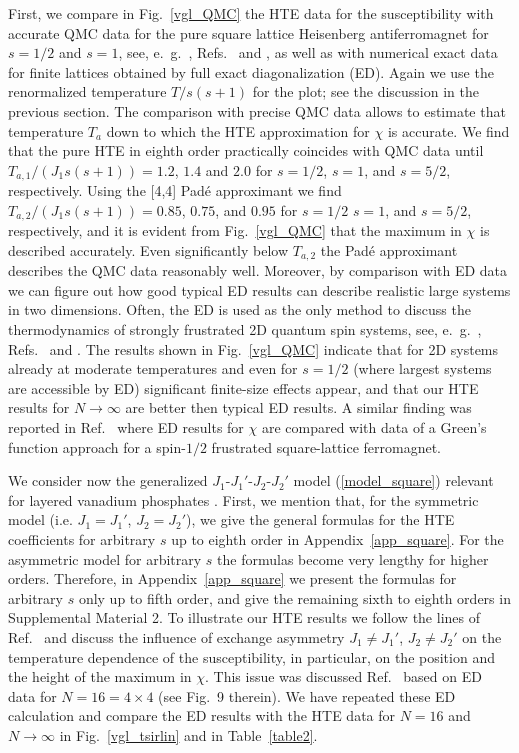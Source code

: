 \documentclass[aps,twocolumn,groupedaddress]{revtex4}
\begin{document}
First, we compare in Fig.~\ref{vgl_QMC} the HTE data for the susceptibility  with accurate QMC data
for the pure square
lattice Heisenberg antiferromagnet  for $s=1/2$ and $s=1$, see, e.~g.~,
Refs.~ and , as well as with numerical exact
data for finite lattices obtained by full exact diagonalization (ED). Again
we use the renormalized temperature $T/s(s+1)$ for the plot; see the
discussion in the previous section.
The comparison with  precise QMC data allows to estimate that
temperature $T_a$ down to which the HTE approximation for $\chi$ is accurate.
We find that the pure HTE in eighth order practically coincides with QMC data
until $T_{a,1}/(J_1s(s+1))=1.2$, $1.4$ and $2.0$ for $s=1/2$, $s=1$,  and $s=5/2$,
respectively. Using the [4,4]
Pad\'e approximant we find $T_{a,2}/(J_1s(s+1))=0.85$, $0.75$, and $0.95$ for $s=1/2$
$s=1$,  and $s=5/2$,
respectively, and it is evident from Fig.~\ref{vgl_QMC} that the
maximum in $\chi$ is described accurately.
Even significantly below $T_{a,2}$ the Pad\'e approximant describes
the QMC data reasonably well.
Moreover, by comparison with ED data we can figure out how good typical ED
results can describe
realistic large systems in two dimensions.
Often, the ED is used as the only method
to discuss the thermodynamics of strongly frustrated 2D quantum spin
systems, see, e.~g.~,
Refs.~ and .
The results shown in  Fig.~\ref{vgl_QMC} indicate that for 2D systems already at moderate temperatures and
even for $s=1/2$ (where largest systems are accessible by ED)
significant finite-size effects appear, and that our HTE results for $N \to
\infty$ are better then typical ED results.
A similar finding was reported in Ref.~ where ED results
for $\chi$ are compared with data of a Green's function approach
for a spin-$1/2$ frustrated square-lattice ferromagnet.

We consider now the
generalized  $J_1$-$J_1'$-$J_2$-$J_2'$ model
(\ref{model_square}) relevant for layered vanadium phosphates
\cite{rosner2009,rosner2010}. First, we
mention that, for the symmetric model (i.e. $J_1 = J_1'$, $J_2 = J_2'$), we
give the general formulas for the HTE coefficients for arbitrary $s$ up to
eighth order in  Appendix~\ref{app_square}.
For the
asymmetric model for arbitrary $s$ the formulas become very lengthy for
higher orders. Therefore,  in  Appendix~\ref{app_square} we present
the formulas for arbitrary $s$ only up to
fifth order, and give the remaining sixth to eighth orders in Supplemental Material
2.\cite{supp2}
To illustrate our HTE results
we follow the lines of Ref.~ and discuss the influence of
exchange asymmetry $J_1 \ne J_1'$, $J_2 \ne J_2'$ on the temperature
dependence of the susceptibility, in particular,
on the position and
the height of the maximum in $\chi$.
This issue was discussed Ref.~ based on ED data for
$N=16=4 \times 4$ (see Fig.~9 therein).
We have repeated these ED calculation and compare the ED  results with the
HTE data for $N=16$ and $N \to \infty$ in Fig.~\ref{vgl_tsirlin} and in
Table~\ref{table2}.
\end{document}
